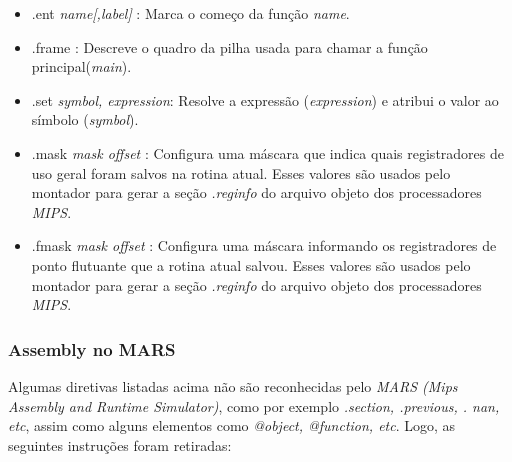 \documentclass[12pt]{article}
\begin{document}
\begin{itemize}
\item .ent \textit{name[,label]} : Marca o começo da função \textit{name}.
\item .frame : Descreve o quadro da pilha usada para chamar a função principal(\textit{main}).
\item .set \textit{symbol, expression}: Resolve a expressão (\textit{expression}) e atribui o valor ao símbolo (\textit{symbol}).
\item .mask \textit{mask offset} : Configura uma máscara que indica quais registradores de uso geral foram salvos na rotina atual. Esses valores são usados pelo montador para gerar a seção \textit{.reginfo} do arquivo objeto dos processadores \textit{MIPS}. 
\item .fmask \textit{mask offset} : Configura uma máscara informando os registradores de ponto flutuante que a rotina atual salvou. Esses valores são usados pelo montador para gerar a seção \textit{.reginfo} do arquivo objeto dos processadores \textit{MIPS}.

\end{itemize}

\subsubsection{Assembly no MARS}
\label{subsubsec:atomars}

Algumas diretivas listadas acima não são reconhecidas pelo \textit{MARS (Mips Assembly and Runtime Simulator)}, como por exemplo \textit{.section, .previous, . nan, etc}, assim como alguns elementos como \textit{@object, @function, etc}. Logo, as seguintes instruções foram retiradas:
\end{document}
